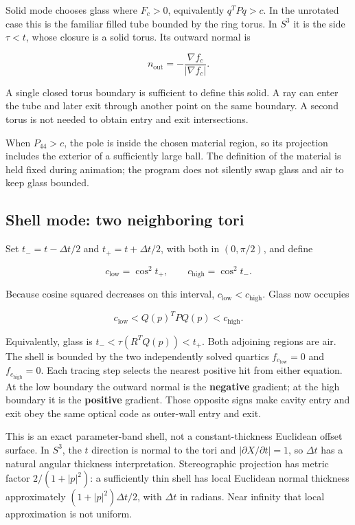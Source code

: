 \documentclass[11pt,a4paper]{article}
\begin{document}
Solid mode chooses glass where \(F_c>0\), equivalently \(q^TPq>c\). In
the unrotated case this is the familiar filled tube bounded by the ring
torus. In \(S^3\) it is the side \(\tau<t\), whose closure is a solid
torus. Its outward normal is

\[
n_{\mathrm{out}}=-\frac{\nabla f_c}{|\nabla f_c|}.
\]

A single closed torus boundary is sufficient to define this solid. A ray
can enter the tube and later exit through another point on the same
boundary. A second torus is not needed to obtain entry and exit
intersections.

When \(P_{44}>c\), the pole is inside the chosen material region, so its
projection includes the exterior of a sufficiently large ball. The
definition of the material is held fixed during animation; the program
does not silently swap glass and air to keep glass bounded.

\subsection{Shell mode: two neighboring
tori}\label{shell-mode-two-neighboring-tori}

Set \(t_-=t-\Delta t/2\) and \(t_+=t+\Delta t/2\), with both in
\((0,\pi/2)\), and define

\[
c_{\mathrm{low}}=\cos^2t_+,\qquad c_{\mathrm{high}}=\cos^2t_-.
\]

Because cosine squared decreases on this interval,
\(c_{\mathrm{low}}<c_{\mathrm{high}}\). Glass now occupies

\[
\boxed{c_{\mathrm{low}}<Q(p)^TPQ(p)<c_{\mathrm{high}}.}
\]

Equivalently, glass is \(t_-<\tau(R^TQ(p))<t_+\). Both adjoining regions
are air. The shell is bounded by the two independently solved quartics
\(f_{c_{\mathrm{low}}}=0\) and \(f_{c_{\mathrm{high}}}=0\). Each tracing
step selects the nearest positive hit from either equation. At the low
boundary the outward normal is the \textbf{negative} gradient; at the
high boundary it is the \textbf{positive} gradient. Those opposite signs
make cavity entry and exit obey the same optical code as outer-wall
entry and exit.

This is an exact parameter-band shell, not a constant-thickness
Euclidean offset surface. In \(S^3\), the \(t\) direction is normal to
the tori and \(|\partial X/\partial t|=1\), so \(\Delta t\) has a
natural angular thickness interpretation. Stereographic projection has
metric factor \(2/(1+|p|^2)\): a sufficiently thin shell has local
Euclidean normal thickness approximately \((1+|p|^2)\Delta t/2\), with
\(\Delta t\) in radians. Near infinity that local approximation is not
uniform.
\end{document}
